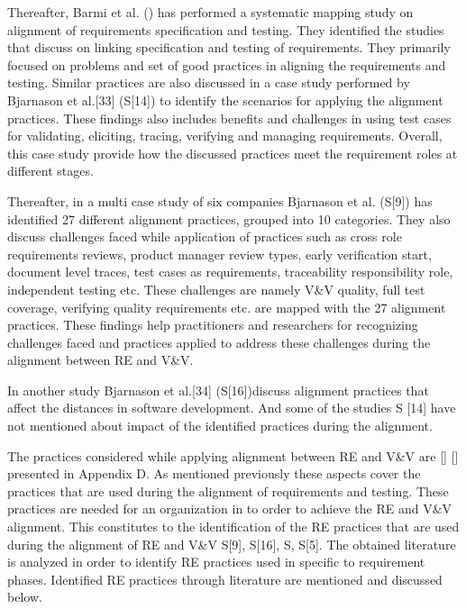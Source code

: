 \documentclass{article}
\begin{document}
Thereafter, Barmi et al. (\cite{barmi2011alignment}) has performed a systematic mapping study on alignment of requirements specification and testing. They identified the studies that discuss on linking specification and testing of requirements. They primarily focused on problems and set of good practices in aligning the requirements and testing. Similar practices are also discussed in a case study performed by Bjarnason et al.[33] (S[14]) to identify the scenarios for applying the alignment practices. These findings also includes benefits and challenges in using test cases for validating, eliciting, tracing, verifying and managing requirements. Overall, this case study provide how the discussed practices meet the requirement roles at different stages.

Thereafter, in a multi case study of six companies Bjarnason et al. \cite{bjarnason2014challengesS9} (S[9]) has identified 27 different alignment practices, grouped into 10 categories. They also discuss challenges faced while application of practices such as cross role requirements reviews, product manager review types, early verification start, document level traces, test cases as requirements, traceability responsibility role, independent testing etc. These challenges are namely V\&V quality, full test coverage, verifying quality requirements etc. are mapped with the 27 alignment practices. These findings help practitioners and researchers for recognizing challenges faced and practices applied to address these challenges during the alignment between RE and V\&V.  

In another study Bjarnason et al.[34] (S[16])discuss alignment practices that affect the distances in software development. And some of the studies S [14] have not mentioned about impact of the identified practices during the alignment.

The practices considered while applying alignment between RE and V\&V are \cite{barmi2011alignment} \cite{kukkanen2009applyingS2} \cite{uusitalo2008linkingS5} \cite{bjarnason2014challenges} [\cite{bjarnason2015industrialS14}] [\cite{bjarnason2014alignment}] presented in Appendix D. As mentioned previously these aspects cover the practices that are used during the alignment of requirements and testing. These practices are needed for an organization in to order to achieve the RE and V\&V alignment. This constitutes to the identification of the RE practices that are used during the alignment of RE and V\&V S[9], S[16], S\cite{bjarnason2014challengesS9}, S[5]. The obtained literature is analyzed in order to identify RE practices used in specific to requirement phases. Identified RE practices through literature are mentioned and discussed below.
\end{document}

